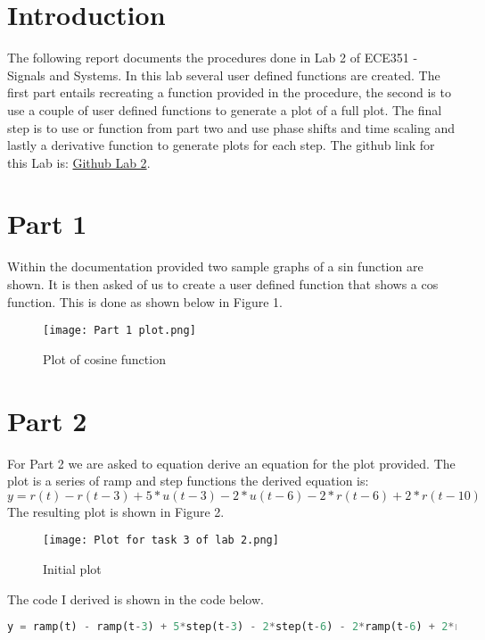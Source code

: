 \documentclass[12pt]{report}
\begin{document}
\section{Introduction}
 

The following report documents the procedures done in Lab 2 of ECE351 - Signals and Systems. In this lab several user defined functions are created. The first part entails recreating a function provided in the procedure, the second is to use a couple of user defined functions to generate a plot of a full plot. The final step is to use or function from part two and use phase shifts and time scaling and lastly a derivative function to generate plots for each step. The github link for this Lab is:  \href{https://github.com/CDJohnson279}{Github Lab 2}. 

\section{Part 1}

Within the documentation provided two sample graphs of a sin function are shown. It is then asked of us to create a user defined function that shows a cos function. This is done as shown below in Figure 1.

\begin{figure}[htp]
    \centering
    \texttt{[image: Part 1 plot.png]}
    \caption{ Plot of cosine function}
    \label{fig:Part 1 plot.png}
\end{figure}

\section{Part 2}

For Part 2 we are asked to equation derive an equation for the plot provided. The plot is a series of ramp and step functions the derived equation is:
$y = r(t) - r(t-3) + 5*u(t-3) - 2*u(t-6) - 2*r(t-6) + 2*r(t-10)$
The resulting plot is shown in Figure 2. 
\begin{figure}[htp]
    \centering
    \texttt{[image: Plot for task 3 of lab 2.png]}
    \caption{Initial plot}
    \label{fig:initial plot.png}
\end{figure}
The code I derived is shown in the code below. 

\begin{lstlisting}[language=Python]
y = ramp(t) - ramp(t-3) + 5*step(t-3) - 2*step(t-6) - 2*ramp(t-6) + 2*ramp(t-10)
\end{lstlisting}
\end{document}
